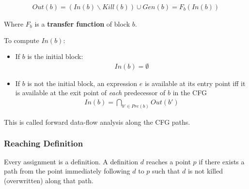 \documentclass[11pt,a4paper,titlepage,dvipsnames,cmyk]{scrartcl}
\begin{document}
\begin{align*}
Out(b) = (In(b) \backslash Kill(b)) \cup Gen(b) = F_b(In(b))
\end{align*}

Where $F_b$ is a \textbf{transfer function} of block $b$.

To compute $In(b)$:
\begin{itemize}
    \item If $b$ is the initial block:
    \begin{align*}
    In(b) = \emptyset
    \end{align*}
    \item If $b$ is not the initial block, an expression $e$ is available at its entry point iff it is available at the exit point of {\color{red}\textit{each}} predecessor of $b$ in the CFG
    \begin{align*}
    In(b) = \bigcap_{b' \in Pre(b)} Out(b')
    \end{align*}
\end{itemize}

This is called forward data-flow analysis along the CFG paths.

\subsubsection{Reaching Definition}
Every assignment is a definition. A definition $d$ reaches a point $p$ if there exists a path from the point immediately following $d$ to $p$ such that $d$ is not killed (overwritten) along that path. 
\end{document}
